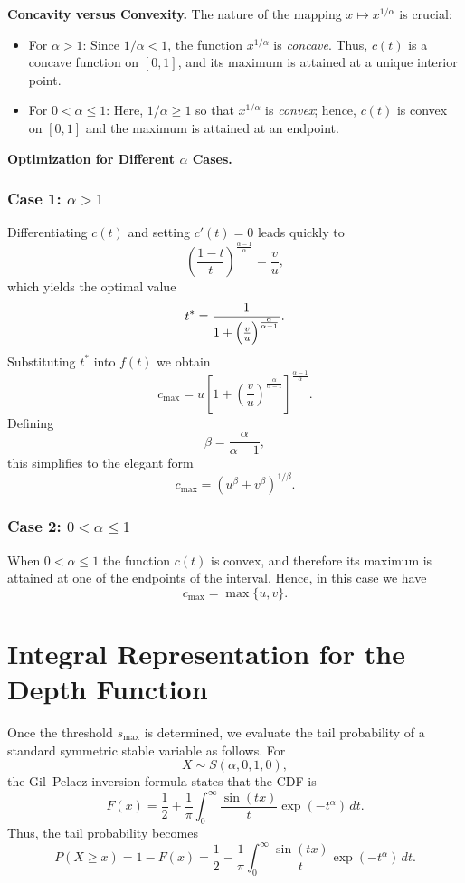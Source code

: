 \medskip
\textbf{Concavity versus Convexity.}  
The nature of the mapping \(x \mapsto x^{1/\alpha}\) is crucial:
\begin{itemize}
  \item For \(\alpha>1\): Since \(1/\alpha < 1\), the function \(x^{1/\alpha}\) is \emph{concave}. Thus, \(c(t)\) is a concave function on \([0,1]\), and its maximum is attained at a unique interior point.
  \item For \(0 < \alpha \le 1\): Here, \(1/\alpha \ge 1\) so that \(x^{1/\alpha}\) is \emph{convex}; hence, \(c(t)\) is convex on \([0,1]\) and the maximum is attained at an endpoint.
\end{itemize}

\medskip
\textbf{Optimization for Different \(\alpha\) Cases.}

\subsubsection*{Case 1: \(\alpha > 1\)}

Differentiating \(c(t)\) and setting \(c'(t)=0\) leads quickly to
\[
\left(\frac{1-t}{t}\right)^{\frac{\alpha-1}{\alpha}} = \frac{v}{u},
\]
which yields the optimal value
\[
t^* = \frac{1}{1+\Bigl(\frac{v}{u}\Bigr)^{\frac{\alpha}{\alpha-1}}}.
\]
Substituting \(t^*\) into \(f(t)\) we obtain
\[
c_{\max} = u \left[1+\left(\frac{v}{u}\right)^{\frac{\alpha}{\alpha-1}}\right]^{\frac{\alpha-1}{\alpha}}.
\]
Defining
\[
\beta = \frac{\alpha}{\alpha-1},
\]
this simplifies to the elegant form
\[
\boxed{c_{\max} = \left(u^\beta + v^\beta\right)^{1/\beta}.}
\]

\subsubsection*{Case 2: \(0 < \alpha \le 1\)}

When \(0<\alpha\le1\) the function \(c(t)\) is convex, and therefore its maximum is attained at one of the endpoints of the interval. Hence, in this case we have
\[
\boxed{c_{\max} = \max\{u,v\}.}
\]


\section{Integral Representation for the Depth Function}

Once the threshold \(s_{\max}\) is determined, we evaluate the tail probability of a standard symmetric stable variable as follows. For 
\[
X\sim S(\alpha,0,1,0),
\]
the Gil–Pelaez inversion formula states that the CDF is
\[
F(x)=\frac{1}{2}+\frac{1}{\pi}\int_0^{\infty}\frac{\sin(tx)}{t}\exp(-t^\alpha)\,dt.
\]
Thus, the tail probability becomes
\[
P(X\ge x)=1-F(x)= \frac{1}{2}-\frac{1}{\pi}\int_0^{\infty}\frac{\sin(tx)}{t}\exp(-t^\alpha)\,dt.
\]

